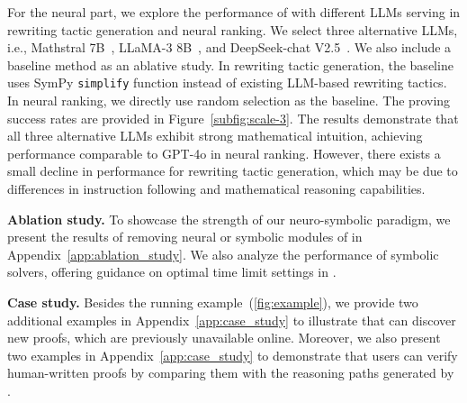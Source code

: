 For the neural part, 
we explore the performance of \name with different LLMs serving in rewriting tactic generation and neural ranking. 
We select three alternative LLMs, i.e., Mathstral 7B~\citep{jiang2023mistral}, LLaMA-3 8B~\citep{llama3modelcard}, and DeepSeek-chat V2.5~\citep{deepseekv2}.
We also include a baseline method as an ablative study.
In rewriting tactic generation, the baseline uses SymPy \texttt{simplify} function instead of existing LLM-based rewriting tactics.
In neural ranking, we directly use random selection as the baseline. 
The proving success rates are provided in Figure~\ref{subfig:scale-3}.
The results demonstrate that all three alternative LLMs exhibit strong mathematical intuition, achieving performance comparable to GPT-4o in neural ranking. 
However, there exists a small decline in performance for rewriting tactic generation, which may be due to differences in instruction following and mathematical reasoning capabilities.



\textbf{Ablation study.} 
To showcase the strength of our neuro-symbolic paradigm, we present the results of removing neural or symbolic modules of \name in Appendix~\ref{app:ablation_study}. 
We also analyze the performance of symbolic solvers, offering guidance on optimal time limit settings in \name.

\textbf{Case study. }
Besides the running example~(\ref{fig:example}),
we provide two additional examples in Appendix~\ref{app:case_study} to illustrate that \name can discover new proofs, which are previously unavailable online.
Moreover, we also present two examples in Appendix~\ref{app:case_study} to demonstrate that users can verify human-written proofs by comparing them with the reasoning paths generated by \name.

